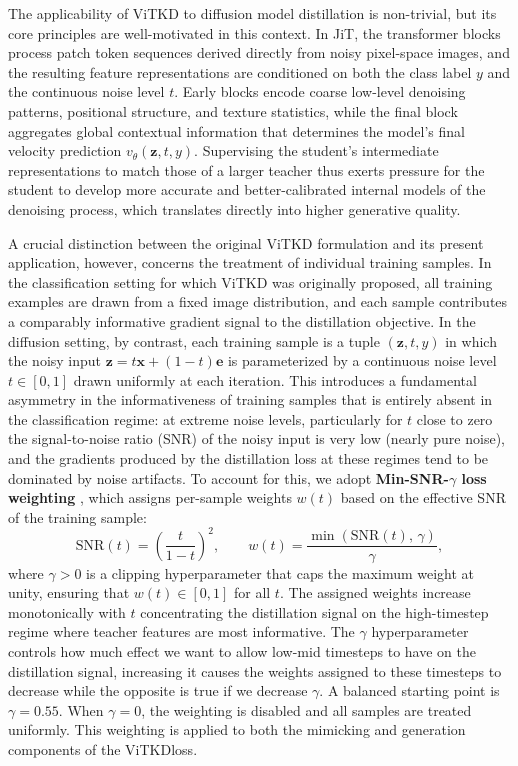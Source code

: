 The applicability of ViTKD \cite{yang2022vitkd} to diffusion model distillation is non-trivial,
but its core principles are well-motivated in this context. In JiT, the transformer blocks process
patch token sequences derived directly from noisy pixel-space images, and the resulting feature
representations are conditioned on both the class label $y$ and the continuous noise level $t$.
Early blocks encode coarse low-level denoising patterns, positional structure, and texture
statistics, while the final block aggregates global contextual information that determines the
model's final velocity prediction $v_\theta(\mathbf{z}, t, y)$. Supervising the student's
intermediate representations to match those of a larger teacher thus exerts pressure for the
student to develop more accurate and better-calibrated internal models of the denoising process,
which translates directly into higher generative quality.

A crucial distinction between the original ViTKD formulation and its present application,
however, concerns the treatment of individual training samples. In the classification setting for
which ViTKD was originally proposed, all training examples are drawn from a fixed image
distribution, and each sample contributes a comparably informative gradient signal to the
distillation objective. In the diffusion setting, by contrast, each training sample is a tuple
$(\mathbf{z}, t, y)$ in which the noisy input $\mathbf{z} = t\mathbf{x} + (1-t)\mathbf{e}$ is
parameterized by a continuous noise level $t \in [0, 1]$ drawn uniformly at each iteration. This
introduces a fundamental asymmetry in the informativeness of training samples that is entirely absent in the classification regime: at extreme noise levels, particularly for $t$ close to zero the
signal-to-noise ratio (SNR) of the noisy input is very low
(nearly pure noise), and the gradients produced by the distillation loss at these regimes tend to
be dominated by noise artifacts. To account for this, we adopt
\textbf{Min-SNR-$\gamma$ loss weighting} \cite{hang2023efficient}, which assigns per-sample weights
$w(t)$ based on the effective SNR of the training sample:
%
\begin{equation}
    \mathrm{SNR}(t) = \left( \frac{t}{1 - t} \right)^2, \qquad
    w(t) = \frac{\min\!\left(\mathrm{SNR}(t),\, \gamma\right)}{\gamma},
    \label{eq:snr_weight}
\end{equation}
%
where $\gamma > 0$ is a clipping hyperparameter that caps the maximum weight at unity, ensuring that $w(t) \in [0, 1]$ for all $t$. The assigned weights increase monotonically with $t$ concentrating the distillation signal on the high-timestep regime where teacher features are most informative. The $\gamma$ hyperparameter controls how much effect we want to allow low-mid timesteps to have on the distillation signal, increasing it causes the weights assigned to these timesteps to decrease while the opposite is true if we decrease $\gamma$. A balanced starting point is $\gamma = 0.55$.
When $\gamma = 0$, the weighting is disabled and all samples are treated
uniformly. This weighting is applied to both the mimicking and generation components of the ViTKDloss.

